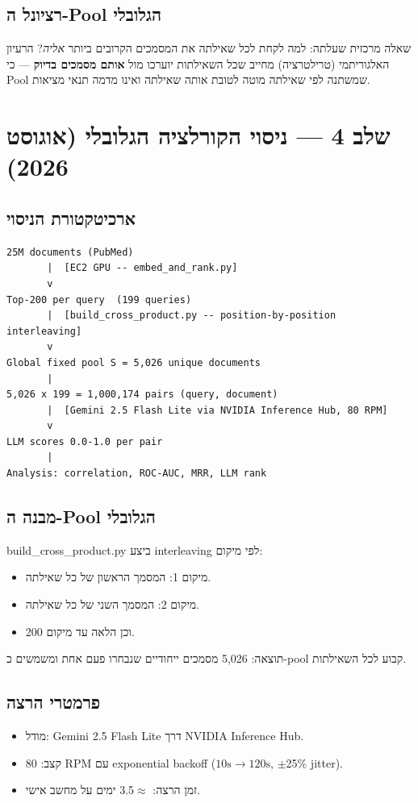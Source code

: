 \documentclass[12pt, a4paper]{article}
\begin{document}
\subsection{רציונל ה-Pool הגלובלי}
שאלה מרכזית שעלתה: למה לקחת לכל שאילתה את המסמכים הקרובים ביותר \emph{אליה}? הרעיון האלגוריתמי (טרילטרציה) מחייב שכל השאילתות יוערכו מול \textbf{אותם מסמכים בדיוק} --- כי \textenglish{Pool} שמשתנה לפי שאילתה מוטה לטובת אותה שאילתה ואינו מדמה תנאי מציאות.

\section{שלב 4 --- ניסוי הקורלציה הגלובלי (אוגוסט 2026)}

\subsection{ארכיטקטורת הניסוי}

\begin{english}
\begin{lstlisting}[style=pipeline]
25M documents (PubMed)
       |  [EC2 GPU -- embed_and_rank.py]
       v
Top-200 per query  (199 queries)
       |  [build_cross_product.py -- position-by-position interleaving]
       v
Global fixed pool S = 5,026 unique documents
       |
5,026 x 199 = 1,000,174 pairs (query, document)
       |  [Gemini 2.5 Flash Lite via NVIDIA Inference Hub, 80 RPM]
       v
LLM scores 0.0-1.0 per pair
       |
Analysis: correlation, ROC-AUC, MRR, LLM rank
\end{lstlisting}
\end{english}

\subsection{מבנה ה-Pool הגלובלי}
\textenglish{build\_cross\_product.py} ביצע \textenglish{interleaving} לפי מיקום:
\begin{itemize}
  \item מיקום 1: המסמך הראשון של כל שאילתה.
  \item מיקום 2: המסמך השני של כל שאילתה.
  \item וכן הלאה עד מיקום 200.
\end{itemize}
תוצאה: 5{,}026 מסמכים ייחודיים שנבחרו פעם אחת ומשמשים כ-\textenglish{pool} קבוע לכל השאילתות.

\subsection{פרמטרי הרצה}
\begin{itemize}
  \item מודל: \textenglish{Gemini 2.5 Flash Lite} דרך \textenglish{NVIDIA Inference Hub}.
  \item קצב: 80 \textenglish{RPM} עם \textenglish{exponential backoff} ($10\text{s} \to 120\text{s}$, $\pm$25\% \textenglish{jitter}).
  \item זמן הרצה: $\approx$3.5 ימים על מחשב אישי.
\end{itemize}
\end{document}

